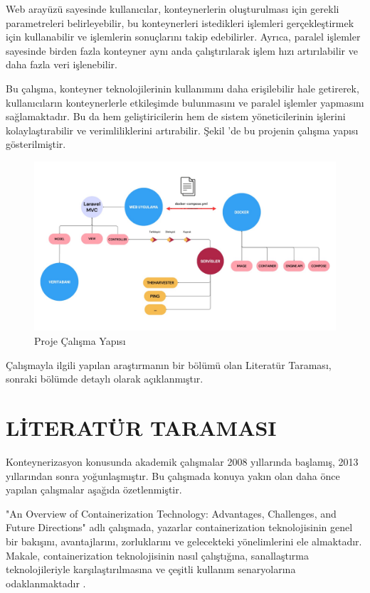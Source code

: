 Web arayüzü sayesinde kullanıcılar, konteynerlerin oluşturulması için gerekli parametreleri belirleyebilir, bu konteynerleri istedikleri işlemleri gerçekleştirmek için kullanabilir ve işlemlerin sonuçlarını  takip edebilirler. Ayrıca, paralel işlemler sayesinde birden fazla konteyner aynı anda çalıştırılarak işlem hızı artırılabilir ve daha fazla veri işlenebilir.

Bu çalışma, konteyner teknolojilerinin kullanımını daha erişilebilir hale getirerek, kullanıcıların konteynerlerle etkileşimde bulunmasını ve paralel işlemler yapmasını sağlamaktadır. Bu da hem geliştiricilerin hem de sistem yöneticilerinin işlerini kolaylaştırabilir ve verimliliklerini artırabilir. Şekil 'de bu projenin çalışma yapısı gösterilmiştir.
\begin{figure}[H]
	\centering
	\includegraphics[width=1\linewidth]{images/project.jpeg}
	\caption{Proje Çalışma Yapısı}
	\label{fig:task_diagram}
\end{figure}

Çalışmayla ilgili yapılan araştırmanın bir bölümü olan Literatür Taraması, sonraki bölümde detaylı olarak açıklanmıştır.
\section{LİTERATÜR TARAMASI}
Konteynerizasyon konusunda akademik çalışmalar 2008 yıllarında başlamış, 2013 yıllarından sonra yoğunlaşmıştır. Bu çalışmada konuya yakın olan daha önce yapılan çalışmalar aşağıda özetlenmiştir.

"An Overview of Containerization Technology: Advantages, Challenges, and Future Directions" adlı çalışmada, yazarlar containerization teknolojisinin genel bir bakışını, avantajlarını, zorluklarını ve gelecekteki yönelimlerini ele almaktadır. Makale, containerization teknolojisinin nasıl çalıştığına, sanallaştırma teknolojileriyle karşılaştırılmasına ve çeşitli kullanım senaryolarına odaklanmaktadır \cite{Smith_Emily}.

